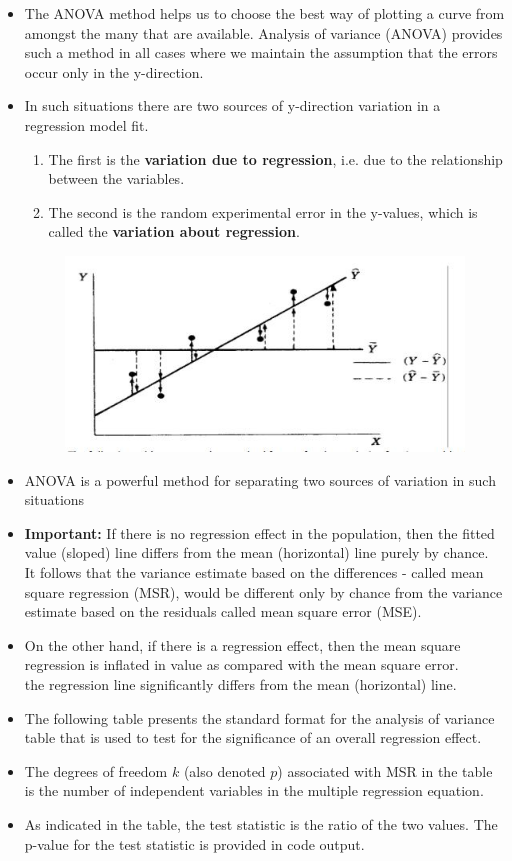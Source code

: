 \documentclass[a4paper,12pt]{article}
\begin{document}
\begin{itemize}
\item The ANOVA method helps us to choose the best way of plotting a curve from amongst the many that
are available. Analysis of variance (ANOVA) provides such a method in all cases where we maintain
the assumption that the errors occur only in the y-direction.
\item  In such situations there are two sources
of y-direction variation in a regression model fit.
\begin{enumerate}
\item The first is the \textbf{variation due to regression}, i.e. due to the relationship between the variables.
\item The second is the random experimental error in the y-values, which is called the \textbf{variation about regression}.
\end{enumerate}
\begin{figure}[h!]
	\centering
	\includegraphics[width=0.9\linewidth]{images/RegressionANOVA-scatterplot}
\end{figure}
\item ANOVA is a powerful method for separating two sources of variation in such situations
\newpage


\item \textbf{Important:} If there is no regression effect in the population, then the fitted value (sloped) line differs from the
mean (horizontal) line purely by chance. \\ It follows that the variance estimate based on the
differences - called mean square regression (MSR), would be different only by chance from the
variance estimate based on the residuals called mean square error (MSE).
\item On the other hand, if there is a regression effect, then the mean square regression is inflated in
value as compared with the mean square error. \\  the regression line significantly differs from the
mean (horizontal) line.
\item The following table presents the standard format for the analysis of variance table that is used to
test for the significance of an overall regression effect. 
\item The degrees of freedom $k$ (also denoted $p$) associated with
MSR in the table is the number of independent variables in the multiple regression equation.
\item As indicated in the table, the test statistic is the ratio of the two values. The p-value for the test
statistic is provided in code output.
\end{itemize}
\end{document}
